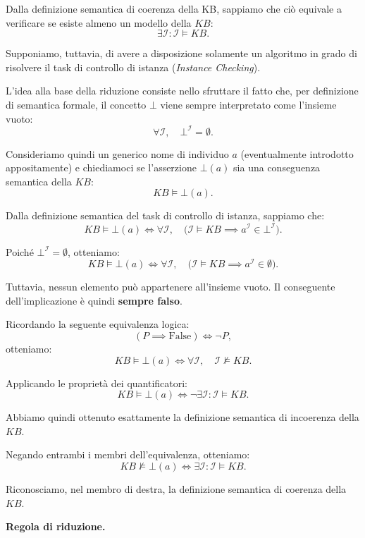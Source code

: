 Dalla definizione semantica di coerenza della KB, sappiamo
che ciò equivale a verificare se esiste almeno un modello
della $KB$:
\[
    \exists \mathcal{I} : \mathcal{I} \models KB.
\]

Supponiamo, tuttavia, di avere a disposizione solamente
un algoritmo in grado di risolvere il task di controllo
di istanza (\textit{Instance Checking}).

L'idea alla base della riduzione consiste nello sfruttare
il fatto che, per definizione di semantica formale,
il concetto $\bot$ viene sempre interpretato come
l'insieme vuoto:
\[
    \forall \mathcal{I}, \quad
    \bot^{\mathcal{I}} = \emptyset.
\]

Consideriamo quindi un generico nome di individuo $a$
(eventualmente introdotto appositamente) e chiediamoci
se l'asserzione $\bot(a)$ sia una conseguenza semantica
della $KB$:
\[
    KB \models \bot(a).
\]

Dalla definizione semantica del task di controllo di
istanza, sappiamo che:
\[
    KB \models \bot(a)
    \iff
    \forall \mathcal{I}, \quad
    \bigl(\mathcal{I} \models KB
    \implies
    a^{\mathcal{I}} \in \bot^{\mathcal{I}}\bigr).
\]

Poiché $\bot^{\mathcal{I}} = \emptyset$, otteniamo:
\[
    KB \models \bot(a)
    \iff
    \forall \mathcal{I}, \quad
    \bigl(\mathcal{I} \models KB
    \implies
    a^{\mathcal{I}} \in \emptyset\bigr).
\]

Tuttavia, nessun elemento può appartenere all'insieme
vuoto. Il conseguente dell'implicazione è quindi
\textbf{sempre falso}.

Ricordando la seguente equivalenza logica:
\[
    (P \implies \mathrm{False}) \iff \neg P,
\]
otteniamo:
\[
    KB \models \bot(a)
    \iff
    \forall \mathcal{I}, \quad
    \mathcal{I} \not\models KB.
\]

Applicando le proprietà dei quantificatori:
\[
    KB \models \bot(a)
    \iff
    \neg \exists \mathcal{I} :
    \mathcal{I} \models KB.
\]

Abbiamo quindi ottenuto esattamente la definizione
semantica di incoerenza della $KB$.

Negando entrambi i membri dell'equivalenza, otteniamo:
\[
    KB \not\models \bot(a)
    \iff
    \exists \mathcal{I} :
    \mathcal{I} \models KB.
\]

Riconosciamo, nel membro di destra, la definizione
semantica di coerenza della $KB$.

\medskip
\textbf{Regola di riduzione.}

